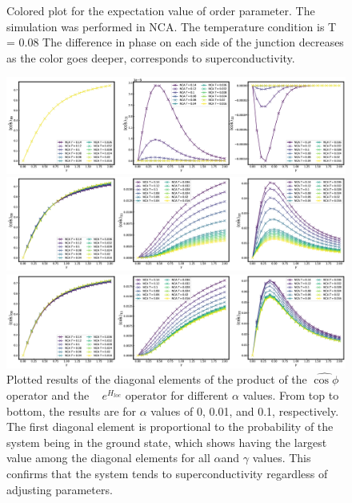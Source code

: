\documentclass{article}
\begin{document}
\begin{spacing}{1.3}
\begin{figure}[H]
  \caption{Colored plot for the expectation value of order parameter. The simulation was performed in NCA. The temperature condition is T = 0.08
  The difference in phase on each side of the junction decreases as the color goes deeper, corresponds to superconductivity.}
  \vfill
\end{figure}
\pagebreak
\begin{figure}[htbp]
  \centerline{\includegraphics[width=13cm]{TexFigure/4/4_3_03_Matele_Ns3_alp0.png}}
  \centerline{\includegraphics[width=13cm]{TexFigure/4/4_3_04_Matele_Ns3_alp0_1.png}}
  \centerline{\includegraphics[width=13cm]{TexFigure/4/4_3_05_Matele_Ns3_alp1.png}}
  \caption{Plotted results of the diagonal elements of the product of the $\hat{\cos\phi}$ operator and the  
  $e^{H_{loc}}$ operator for different $\alpha$ values. From top to bottom, the results are for $\alpha$ 
  values of 0, 0.01, and 0.1, respectively. The first diagonal element is proportional to the probability of 
  the system being in the ground state, which shows having the largest value among the diagonal elements 
  for all $\alpha $and $\gamma$ values. This confirms that the system tends to superconductivity regardless of 
  adjusting parameters.}
  \end{figure}
\pagebreak

\end{spacing}
\end{document}

